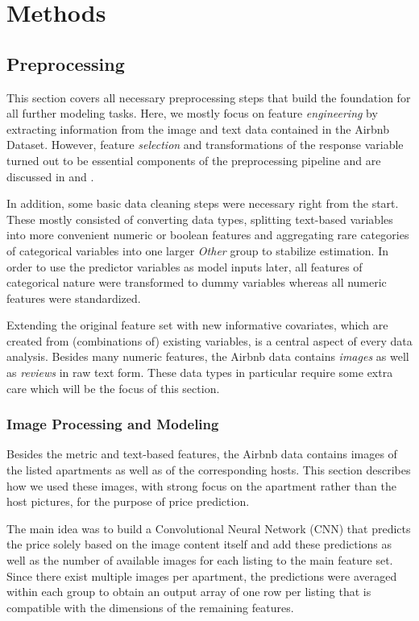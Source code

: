 \section{Methods}

\subsection{Preprocessing}

This section covers all necessary preprocessing steps that build the foundation for all further modeling tasks.
Here, we mostly focus on feature \emph{engineering} by extracting information from the image and text data contained in the Airbnb Dataset.
However, feature \emph{selection} and transformations of the response variable turned out to be essential components of the preprocessing pipeline and are discussed in  and .

In addition, some basic data cleaning steps were necessary right from the start.
These mostly consisted of converting data types, splitting text-based variables into more convenient numeric or boolean features and aggregating rare categories of categorical variables into one larger \emph{Other} group to stabilize estimation.
In order to use the predictor variables as model inputs later, all features of categorical nature were transformed to dummy variables whereas all numeric features were standardized.

Extending the original feature set with new informative covariates, which are created from (combinations of) existing variables, is a central aspect of every data analysis.
Besides many numeric features, the Airbnb data contains \emph{images} as well as \emph{reviews} in raw text form.
These data types in particular require some extra care which will be the focus of this section.

\subsubsection{Image Processing and Modeling}

Besides the metric and text-based features, the Airbnb data contains images of the listed apartments as well as of the corresponding hosts.
This section describes how we used these images, with strong focus on the apartment rather than the host pictures, for the purpose of price prediction.

The main idea was to build a Convolutional Neural Network (CNN) that predicts the price solely based on the image content itself and add these predictions as well as the number of available images for each listing to the main feature set.
Since there exist multiple images per apartment, the predictions were averaged within each group to obtain an output array of one row per listing that is compatible with the dimensions of the remaining features.


